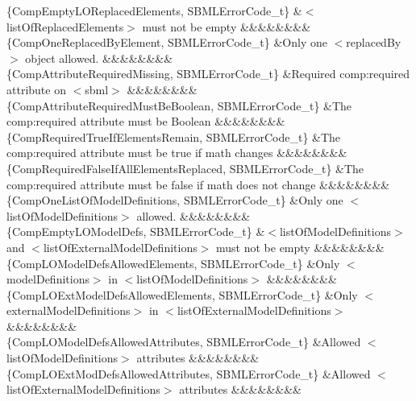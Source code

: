\begin{DoxyParagraph}{}
\begin{longtabu}
\{Comp\+Empty\+L\+O\+Replaced\+Elements, S\+B\+M\+L\+Error\+Code\+\_\+t\} &{\ttfamily $<$list\+Of\+Replaced\+Elements$>$} must not be empty &&&&&&&&\\
\{Comp\+One\+Replaced\+By\+Element, S\+B\+M\+L\+Error\+Code\+\_\+t\} &Only one {\ttfamily $<$replaced\+By$>$} object allowed. &&&&&&&&\\
\{Comp\+Attribute\+Required\+Missing, S\+B\+M\+L\+Error\+Code\+\_\+t\} &Required comp\+:required attribute on {\ttfamily $<$sbml$>$} &&&&&&&&\\
\{Comp\+Attribute\+Required\+Must\+Be\+Boolean, S\+B\+M\+L\+Error\+Code\+\_\+t\} &The comp\+:required attribute must be Boolean &&&&&&&&\\
\{Comp\+Required\+True\+If\+Elements\+Remain, S\+B\+M\+L\+Error\+Code\+\_\+t\} &The comp\+:required attribute must be \textquotesingle{}true\textquotesingle{} if math changes &&&&&&&&\\
\{Comp\+Required\+False\+If\+All\+Elements\+Replaced, S\+B\+M\+L\+Error\+Code\+\_\+t\} &The comp\+:required attribute must be \textquotesingle{}false\textquotesingle{} if math does not change &&&&&&&&\\
\{Comp\+One\+List\+Of\+Model\+Definitions, S\+B\+M\+L\+Error\+Code\+\_\+t\} &Only one {\ttfamily $<$list\+Of\+Model\+Definitions$>$} allowed. &&&&&&&&\\
\{Comp\+Empty\+L\+O\+Model\+Defs, S\+B\+M\+L\+Error\+Code\+\_\+t\} &{\ttfamily $<$list\+Of\+Model\+Definitions$>$} and {\ttfamily $<$list\+Of\+External\+Model\+Definitions$>$} must not be empty &&&&&&&&\\
\{Comp\+L\+O\+Model\+Defs\+Allowed\+Elements, S\+B\+M\+L\+Error\+Code\+\_\+t\} &Only {\ttfamily $<$model\+Definitions$>$} in {\ttfamily $<$list\+Of\+Model\+Definitions$>$} &&&&&&&&\\
\{Comp\+L\+O\+Ext\+Model\+Defs\+Allowed\+Elements, S\+B\+M\+L\+Error\+Code\+\_\+t\} &Only {\ttfamily $<$external\+Model\+Definitions$>$} in {\ttfamily $<$list\+Of\+External\+Model\+Definitions$>$} &&&&&&&&\\
\{Comp\+L\+O\+Model\+Defs\+Allowed\+Attributes, S\+B\+M\+L\+Error\+Code\+\_\+t\} &Allowed {\ttfamily $<$list\+Of\+Model\+Definitions$>$} attributes &&&&&&&&\\
\{Comp\+L\+O\+Ext\+Mod\+Defs\+Allowed\+Attributes, S\+B\+M\+L\+Error\+Code\+\_\+t\} &Allowed {\ttfamily $<$list\+Of\+External\+Model\+Definitions$>$} attributes &&&&&&&&\\

\end{longtabu}
\end{DoxyParagraph}
